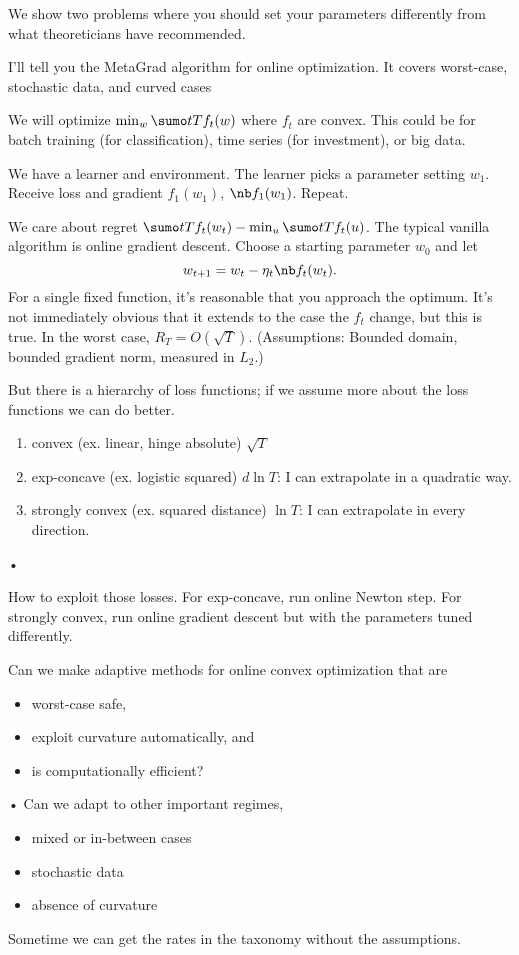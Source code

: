 We show two problems where you should set your parameters differently from what theoreticians have recommended.


I'll tell you the MetaGrad algorithm for online optimization. It covers worst-case, stochastic data, and curved cases


We will optimize $\min_w \sumo tT f_t(w)$ where $f_t$ are convex. This could be for batch training (for classification), time series (for investment), or big data.

We have a learner and environment. The learner picks a parameter setting $w_1$. %
Receive loss and gradient $f_1(w_1)$, $\nb f_1(w_1)$. Repeat.

We care about regret $\sumo tT f_t(w_t) - \min_u \sumo tT f_t(u)$. %
The typical vanilla algorithm is online gradient descent. Choose a starting parameter $w_0$ and let
$$
w_{t+1} = w_t - \eta_t \nb f_t(w_t).
$$
For a single fixed function, it's reasonable that you approach the optimum. It's not immediately obvious that it extends to the case the $f_t$ change, but this is true. In the worst case, $R_T=O(\sqrt T)$. (Assumptions: Bounded domain, bounded gradient norm, measured in $L_2$.)

But there is a hierarchy of loss functions; if we assume more about the loss functions we can do better. 
\begin{enumerate}
\item
convex (ex. linear, hinge absolute) $\sqrt T$
\item
exp-concave (ex. logistic squared) $d\ln T$: I can extrapolate in a quadratic way.
\item
strongly convex (ex. squared distance) $\ln T$: I can extrapolate in every direction.
\end{enumerate}•

How to exploit those losses. For exp-concave, run online Newton step. For strongly convex, run online gradient descent but with the parameters tuned differently.

Can we make adaptive methods for online convex optimization that are 
\begin{itemize}
\item
worst-case safe, 
\item 
exploit curvature automatically, and 
\item 
is computationally efficient? 
\end{itemize}•
Can we adapt to other important regimes,
\begin{itemize}
\item
mixed or in-between cases
\item
stochastic data
\item
absence of curvature
\end{itemize}
Sometime we can get the rates in the taxonomy without the assumptions.

